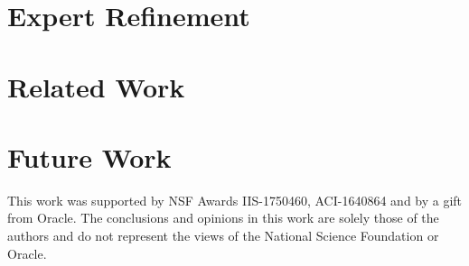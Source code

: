 \documentclass[sigconf]{acmart}
\begin{document}
\section{Expert Refinement}
\label{sec:expertui}


\section{Related Work}
\label{sec:related}
 

\section{Future Work}
\label{sec:future}


\begin{acks}
This work was supported by NSF Awards IIS-1750460, ACI-1640864 and by a gift from Oracle.
The conclusions and opinions in this work are solely those of the
authors and do not represent the views of the National Science Foundation or Oracle.
\end{acks}



\end{document}
